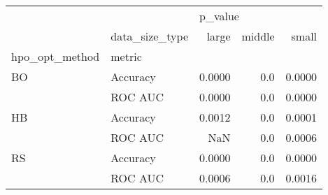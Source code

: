 \begin{tabular}{llrrr}
\toprule
   & {} & \multicolumn{3}{l}{p\_value} \\
   & data\_size\_type &   large & middle &   small \\
hpo\_opt\_method & metric &         &        &         \\
\midrule
BO & Accuracy &  0.0000 &    0.0 &  0.0000 \\
   & ROC AUC &  0.0000 &    0.0 &  0.0000 \\
HB & Accuracy &  0.0012 &    0.0 &  0.0001 \\
   & ROC AUC &     NaN &    0.0 &  0.0006 \\
RS & Accuracy &  0.0000 &    0.0 &  0.0000 \\
   & ROC AUC &  0.0006 &    0.0 &  0.0016 \\
\bottomrule
\end{tabular}
